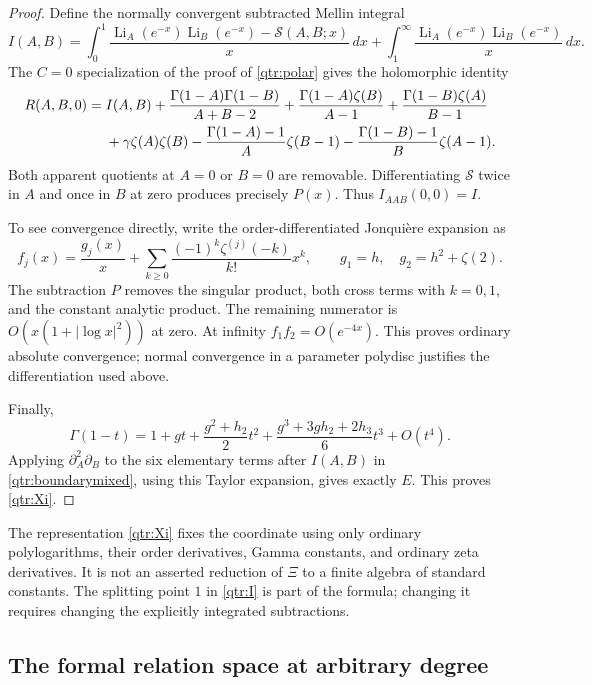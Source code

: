\documentclass[11pt,a4paper]{article}
\numberwithin{equation}{section}
\theoremstyle{definition}
\theoremstyle{remark}
\begin{document}
\begin{proof}
Define the normally convergent subtracted Mellin integral
\[
 I(A,B)=\int_0^1
 \frac{\operatorname{Li}_A(e^{-x})\operatorname{Li}_B(e^{-x})
                    -\mathcal S(A,B;x)}{x}\,dx
 +\int_1^\infty
 \frac{\operatorname{Li}_A(e^{-x})\operatorname{Li}_B(e^{-x})}{x}\,dx.
\]
The \(C=0\) specialization of the proof of \eqref{qtr:polar} gives
the holomorphic identity
\begin{align}
 R(A,B,0)={}&I(A,B)
 +\frac{\Gamma(1-A)\Gamma(1-B)}{A+B-2}
 +\frac{\Gamma(1-A)\zeta(B)}{A-1}
 +\frac{\Gamma(1-B)\zeta(A)}{B-1}\notag\\
 &+\gamma\zeta(A)\zeta(B)
 -\frac{\Gamma(1-A)-1}{A}\zeta(B-1)
 -\frac{\Gamma(1-B)-1}{B}\zeta(A-1).
 \label{qtr:boundarymixed}
\end{align}
Both apparent quotients at \(A=0\) or \(B=0\) are removable.
Differentiating \(\mathcal S\) twice in \(A\) and once in \(B\)
at zero produces precisely \(P(x)\). Thus
\(I_{AAB}(0,0)=I\).

To see convergence directly, write the order-differentiated
Jonqui\`ere expansion as
\[
 f_j(x)=\frac{g_j(x)}{x}
       +\sum_{k\ge0}\frac{(-1)^k\zeta^{(j)}(-k)}{k!}x^k,
 \qquad
 g_1=h,\quad g_2=h^2+\zeta(2).
\]
The subtraction \(P\) removes the singular product, both
cross terms with \(k=0,1\), and the constant analytic product.
The remaining numerator is
\(O(x(1+|\log x|^2))\) at zero. At infinity
\(f_1f_2=O(e^{-4x})\). This proves ordinary absolute convergence;
normal convergence in a parameter polydisc justifies the
differentiation used above.

Finally,
\[
 \Gamma(1-t)=1+gt+\frac{g^2+h_2}{2}t^2
               +\frac{g^3+3gh_2+2h_3}{6}t^3+O(t^4).
\]
Applying \(\partial_A^2\partial_B\) to the six elementary
terms after \(I(A,B)\) in \eqref{qtr:boundarymixed}, using this
Taylor expansion, gives exactly \(E\). This proves
\eqref{qtr:Xi}.
\end{proof}

The representation \eqref{qtr:Xi} fixes the coordinate using only
ordinary polylogarithms, their order derivatives, Gamma constants,
and ordinary zeta derivatives. It is not an asserted reduction
of \(\Xi\) to a finite algebra of standard constants.
The splitting point \(1\) in \eqref{qtr:I} is part of the formula;
changing it requires changing the explicitly integrated
subtractions.

\subsection{The formal relation space at arbitrary degree}
\end{document}
